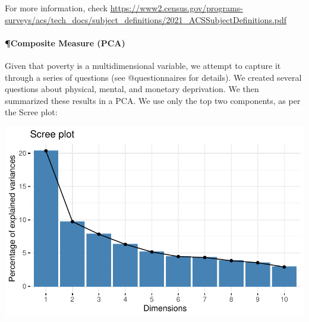 For more information, check
\url{https://www2.census.gov/programs-surveys/acs/tech_docs/subject_definitions/2021_ACSSubjectDefinitions.pdf}

\hypertarget{composite-measure-pca}{%
\paragraph{¶Composite Measure (PCA)}\label{composite-measure-pca}}

Given that poverty is a multidimensional variable, we attempt to capture
it through a series of questions (see @questionnaires for details). We
created several questions about physical, mental, and monetary
deprivation. We then summarized these results in a PCA. We use only the
top two components, as per the Scree plot:

\includegraphics{thesis-file-ppq_files/figure-latex/pca-scree-1.pdf}

